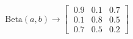 \documentclass[preview]{standalone}
\begin{document}
\begin{align*}
\text{Beta}(a,b) \longrightarrow \begin{bmatrix}\
                      0.9 & 0.1 & 0.7 \\\
                      0.1 & 0.8 & 0.5 \\\
                      0.7 & 0.5 & 0.2 \end{bmatrix}
\end{align*}
\end{document}
